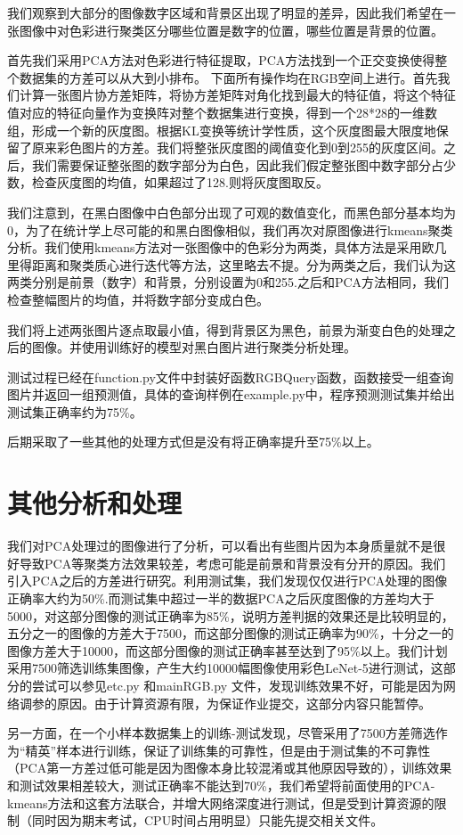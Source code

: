 \documentclass[UTF8,a4paper]{paper}
\begin{document}
我们观察到大部分的图像数字区域和背景区出现了明显的差异，因此我们希望在一张图像中对色彩进行聚类区分哪些位置是数字的位置，哪些位置是背景的位置。

首先我们采用PCA方法对色彩进行特征提取，PCA方法找到一个正交变换使得整个数据集的方差可以从大到小排布。
下面所有操作均在RGB空间上进行。首先我们计算一张图片协方差矩阵，将协方差矩阵对角化找到最大的特征值，将这个特征值对应的特征向量作为变换阵对整个数据集进行变换，得到一个28*28的一维数组，形成一个新的灰度图。根据KL变换等统计学性质，这个灰度图最大限度地保留了原来彩色图片的方差。我们将整张灰度图的阈值变化到0到255的灰度区间。之后，我们需要保证整张图的数字部分为白色，因此我们假定整张图中数字部分占少数，检查灰度图的均值，如果超过了128.则将灰度图取反。

我们注意到，在黑白图像中白色部分出现了可观的数值变化，而黑色部分基本均为0，为了在统计学上尽可能的和黑白图像相似，我们再次对原图像进行kmeans聚类分析。我们使用kmeans方法对一张图像中的色彩分为两类，具体方法是采用欧几里得距离和聚类质心进行迭代等方法，这里略去不提。分为两类之后，我们认为这两类分别是前景（数字）和背景，分别设置为0和255.之后和PCA方法相同，我们检查整幅图片的均值，并将数字部分变成白色。

我们将上述两张图片逐点取最小值，得到背景区为黑色，前景为渐变白色的处理之后的图像。并使用训练好的模型对黑白图片进行聚类分析处理。

测试过程已经在function.py文件中封装好函数RGBQuery函数，函数接受一组查询图片并返回一组预测值，具体的查询样例在example.py中，程序预测测试集并给出测试集正确率约为75\%。

后期采取了一些其他的处理方式但是没有将正确率提升至75\%以上。

\section{其他分析和处理}
我们对PCA处理过的图像进行了分析，可以看出有些图片因为本身质量就不是很好导致PCA等聚类方法效果较差，考虑可能是前景和背景没有分开的原因。我们引入PCA之后的方差进行研究。利用测试集，我们发现仅仅进行PCA处理的图像正确率大约为50\%.而测试集中超过一半的数据PCA之后灰度图像的方差均大于5000，对这部分图像的测试正确率为85\%，说明方差判据的效果还是比较明显的，五分之一的图像的方差大于7500，而这部分图像的测试正确率为90\%，十分之一的图像方差大于10000，而这部分图像的测试正确率甚至达到了95\%以上。我们计划采用7500筛选训练集图像，产生大约10000幅图像使用彩色LeNet-5进行测试，这部分的尝试可以参见etc.py 和mainRGB.py 文件，发现训练效果不好，可能是因为网络调参的原因。由于计算资源有限，为保证作业提交，这部分内容只能暂停。

另一方面，在一个小样本数据集上的训练-测试发现，尽管采用了7500方差筛选作为“精英”样本进行训练，保证了训练集的可靠性，但是由于测试集的不可靠性（PCA第一方差过低可能是因为图像本身比较混淆或其他原因导致的），训练效果和测试效果相差较大，测试正确率不能达到70\%，我们希望将前面使用的PCA-kmeans方法和这套方法联合，并增大网络深度进行测试，但是受到计算资源的限制（同时因为期末考试，CPU时间占用明显）只能先提交相关文件。
\end{document}
